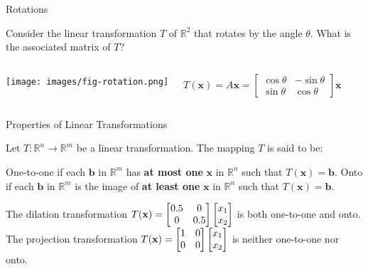 \documentclass[xcolor=dvipsnames,aspectratio=169,t]{beamer}
\begin{document}
\begin{frame}{Rotations}

Consider the linear transformation $T$ of $\mathbb{R}^2$ that rotates by the angle $\theta$.
What is the associated matrix of $T$?
\bigskip

\pause
\begin{columns}
\column{0.6\tw}
  \begin{center}
  \texttt{[image: images/fig-rotation.png]}
  \end{center}

\column{0.4\tw}
  \vspace*{3em}
  
  $T(\mathbf{x})= A\mathbf{x}= 
  \begin{bmatrix} \cos \theta & -\sin \theta \\ \sin\theta & \cos\theta \end{bmatrix}\mathbf{x}$
\end{columns}
\end{frame}



\begin{frame}{Properties of Linear Transformations}

\bbox
Let $T: \mathbb{R}^n \to \mathbb{R}^m$ be a linear transformation. The mapping $T$ is said to be:

\bi
\ii  \alert{One-to-one} if each $\mathbf{b}$ in $\mathbb{R}^m$ has \textbf{at most one} $\mathbf{x}$ in $\mathbb{R}^n$ such that $T( \mathbf{x}) = \mathbf{b}$.
\ii \alert{Onto} if each $\mathbf{b}$ in $\mathbb{R}^m$ is the image of \textbf{at least one} $\mathbf{x}$ in $\mathbb{R}^n$ such that $T( \mathbf{x}) = \mathbf{b}$.
\ei

\ebox

  \pause
  \begin{example}
  \bi 
  \ii The dilation transformation $\displaystyle T(\mathbf{x}) =  \begin{bmatrix}  0.5 & 0 \\ 0 & 0.5 \end{bmatrix} \begin{bmatrix} x_1 \\ x_2 \end{bmatrix}$ is both one-to-one and onto.
  \medskip
  \ii The projection transformation $\displaystyle T(\mathbf{x}) =  \begin{bmatrix}  1 & 0 \\ 0 & 0 \end{bmatrix} \begin{bmatrix} x_1 \\ x_2 \end{bmatrix}$ is neither one-to-one nor onto.
  \ei
  \end{example}

\end{frame}
\end{document}
